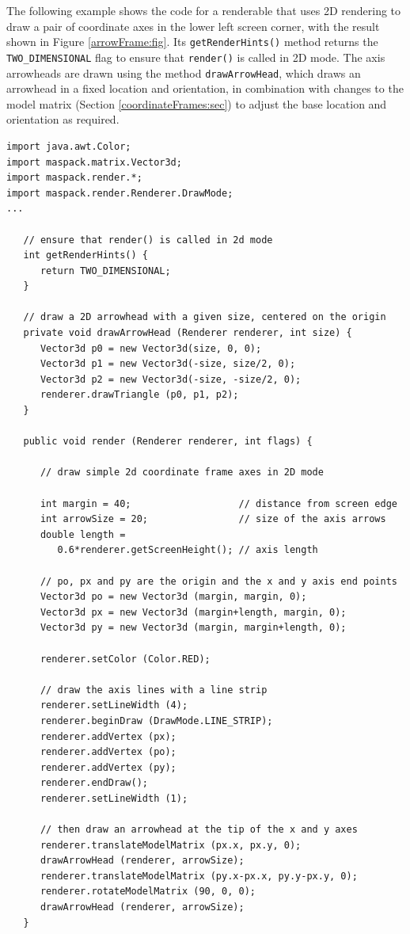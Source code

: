 The following example shows the code for a renderable that uses 2D
rendering to draw a pair of coordinate axes in the lower left screen
corner, with the result shown in Figure \ref{arrowFrame:fig}.  Its
{\tt getRenderHints()} method returns the {\tt TWO\_DIMENSIONAL} flag
to ensure that {\tt render()} is called in 2D mode.  The axis
arrowheads are drawn using the method {\tt drawArrowHead}, which draws
an arrowhead in a fixed location and orientation, in combination with
changes to the model matrix (Section \ref{coordinateFrames:sec}) to
adjust the base location and orientation as required.
%
\begin{lstlisting}[]
import java.awt.Color;
import maspack.matrix.Vector3d;
import maspack.render.*;
import maspack.render.Renderer.DrawMode;
...

   // ensure that render() is called in 2d mode
   int getRenderHints() {
      return TWO_DIMENSIONAL;
   }
   
   // draw a 2D arrowhead with a given size, centered on the origin
   private void drawArrowHead (Renderer renderer, int size) {
      Vector3d p0 = new Vector3d(size, 0, 0);
      Vector3d p1 = new Vector3d(-size, size/2, 0);
      Vector3d p2 = new Vector3d(-size, -size/2, 0);
      renderer.drawTriangle (p0, p1, p2);
   }         
   
   public void render (Renderer renderer, int flags) {
   
      // draw simple 2d coordinate frame axes in 2D mode
   
      int margin = 40;                   // distance from screen edge
      int arrowSize = 20;                // size of the axis arrows
      double length = 
         0.6*renderer.getScreenHeight(); // axis length
   
      // po, px and py are the origin and the x and y axis end points
      Vector3d po = new Vector3d (margin, margin, 0);
      Vector3d px = new Vector3d (margin+length, margin, 0);
      Vector3d py = new Vector3d (margin, margin+length, 0);
   
      renderer.setColor (Color.RED);
      
      // draw the axis lines with a line strip
      renderer.setLineWidth (4);
      renderer.beginDraw (DrawMode.LINE_STRIP);
      renderer.addVertex (px);
      renderer.addVertex (po);
      renderer.addVertex (py);
      renderer.endDraw();
      renderer.setLineWidth (1);
   
      // then draw an arrowhead at the tip of the x and y axes
      renderer.translateModelMatrix (px.x, px.y, 0);
      drawArrowHead (renderer, arrowSize);
      renderer.translateModelMatrix (py.x-px.x, py.y-px.y, 0);
      renderer.rotateModelMatrix (90, 0, 0);
      drawArrowHead (renderer, arrowSize);
   }
\end{lstlisting}
%

